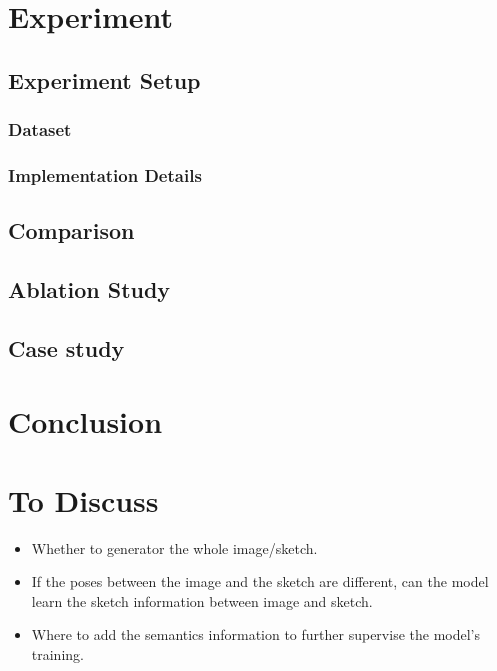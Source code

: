 \documentclass[10pt,twocolumn,letterpaper]{article}
\begin{document}
\section{Experiment}

\subsection{Experiment Setup}

\subsubsection{Dataset}

\subsubsection{Implementation Details}

\subsection{Comparison}

\subsection{Ablation Study}

\subsection{Case study}

\section{Conclusion}

\section{To Discuss}
\begin{itemize}
	\item Whether to generator the whole image/sketch.
	\item If the poses between the image and the sketch are different, can the model learn the sketch information between image and sketch.
	\item Where to add the semantics information to further supervise the model's training.
\end{itemize}


{\small


}
\end{document}
